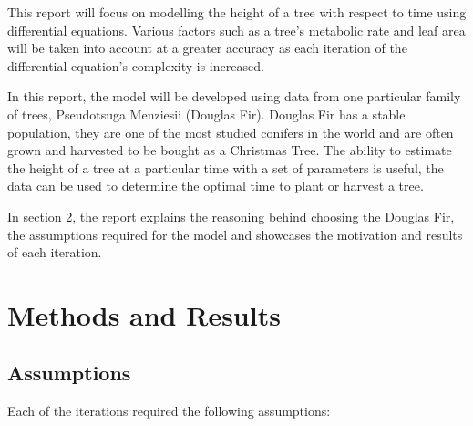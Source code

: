 \documentclass[twocolumn]{article} %
\begin{document}
This report will focus on modelling the height of a tree with respect to time using differential equations. Various factors such as a tree’s metabolic rate and leaf area will be taken into account at a greater accuracy as each iteration of the differential equation’s complexity is increased.

In this report, the model will be developed using data from one particular family of trees, Pseudotsuga Menziesii (Douglas Fir). Douglas Fir has a stable population, they are one of the most studied conifers in the world and are often grown and harvested to be bought as a Christmas Tree. The ability to estimate the height of a tree at a particular time with a set of parameters is useful, the data can be used to determine the optimal time to plant or harvest a tree.

In section 2, the report explains the reasoning behind choosing the Douglas Fir, the assumptions required for the model and showcases the motivation and results of each iteration.


\section{Methods and Results}
\subsection{Assumptions}

Each of the iterations required the following assumptions:
\end{document}
